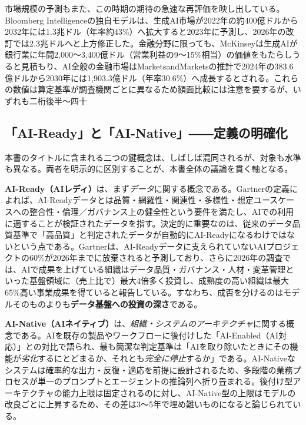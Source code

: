 市場規模の予測もまた、この時期の期待の急速な再評価を映し出している。Bloomberg Intelligenceの独自モデルは、生成AI市場が2022年の約400億ドルから2032年には1.3兆ドル（年率約43\%）へ拡大すると2023年に予測し、2026年の改訂では2.3兆ドルへと上方修正した\cite{x01bi2023genaimarket}。金融分野に限っても、McKinseyは生成AIが銀行業に年間2,000〜3,400億ドル（営業利益の9〜15\%相当）の価値をもたらしうると見積もり\cite{x01mckinsey2023banking}、AI全般の金融市場はMarketsandMarketsの推計で2024年の383.6億ドルから2030年には1,903.3億ドル（年率30.6\%）へ成長するとされる\cite{x01marketsandmarkets2024aifinance}。これらの数値は算定基準が調査機関ごとに異なるため額面比較には注意を要するが、いずれも二桁後半〜四十%

\subsection{「AI-Ready」と「AI-Native」――定義の明確化}
\label{sec:intro-definition}

本書のタイトルに含まれる二つの鍵概念は、しばしば混同されるが、対象も水準も異なる。両者を明示的に区別することが、本書全体の議論を貫く軸となる。

\textbf{AI-Ready（AIレディ）}は、まず\emph{データ}に関する概念である。Gartnerの定義によれば、AI-Readyデータとは品質・網羅性・関連性・多様性・想定ユースケースへの整合性・倫理／ガバナンス上の健全性という要件を満たし、AIでの利用に適することが検証されたデータを指す。決定的に重要なのは、従来のデータ品質基準で「高品質」と判定されたデータが自動的にAI-Readyになるわけではないという点である\cite{x01gartner2025aiready}。Gartnerは、AI-Readyデータに支えられていないAIプロジェクトの60\%が2026年までに放棄されると予測しており\cite{x01gartner2025aiready}、さらに2026年の調査では、AIで成果を上げている組織はデータ品質・ガバナンス・人材・変革管理といった基盤領域に（売上比で）最大4倍多く投資し、成熟度の高い組織は最大65\%高い事業成果を得ていると報告している\cite{x01gartner2026foundations}。すなわち、成否を分けるのはモデルそのものよりも\textbf{データ基盤への投資の深さ}である。

\textbf{AI-Native（AIネイティブ）}は、\emph{組織・システムのアーキテクチャ}に関する概念である。AIを既存の製品やワークフローに後付けした「AI-Enabled（AI対応）」との対比で語られ、最も簡潔な判定基準は「AIを取り除いたときにその機能が\emph{劣化}するにとどまるか、それとも\emph{完全に停止}するか」である\cite{x01crv2025ainative}。AI-Nativeなシステムは確率的な出力・反復・適応を前提に設計されるため、多段階の業務プロセスが単一のプロンプトとエージェントの推論列へ折り畳まれる。後付け型アーキテクチャの能力上限は固定されるのに対し、AI-Native型の上限はモデルの改良ごとに上昇するため、その差は3〜5年で埋め難いものになると論じられている\cite{x01crv2025ainative}。

